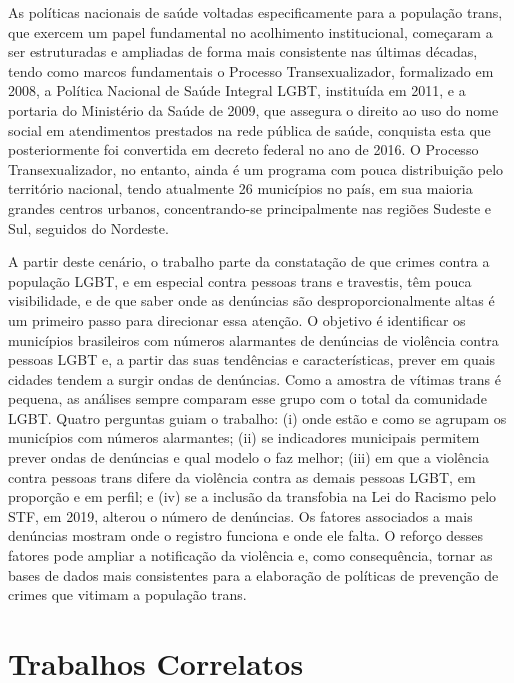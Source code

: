 \documentclass[12pt]{article}
\begin{document}
As políticas nacionais de saúde voltadas especificamente para a população trans, que exercem um papel fundamental no acolhimento institucional, começaram a ser estruturadas e ampliadas de forma mais consistente nas últimas décadas, tendo como marcos fundamentais o Processo Transexualizador, formalizado em 2008, a Política Nacional de Saúde Integral LGBT, instituída em 2011, e a portaria do Ministério da Saúde de 2009, que assegura o direito ao uso do nome social em atendimentos prestados na rede pública de saúde, conquista esta que posteriormente foi convertida em decreto federal no ano de 2016. O Processo Transexualizador, no entanto, ainda é um programa com pouca distribuição pelo território nacional, tendo atualmente 26 municípios no país, em sua maioria grandes centros urbanos, concentrando-se principalmente nas regiões Sudeste e Sul, seguidos do Nordeste.

A partir deste cenário, o trabalho parte da constatação de que crimes contra a população LGBT, e em especial contra pessoas trans e travestis, têm pouca visibilidade, e de que saber onde as denúncias são desproporcionalmente altas é um primeiro passo para direcionar essa atenção. O objetivo é identificar os municípios brasileiros com números alarmantes de denúncias de violência contra pessoas LGBT e, a partir das suas tendências e características, prever em quais cidades tendem a surgir ondas de denúncias. Como a amostra de vítimas trans é pequena, as análises sempre comparam esse grupo com o total da comunidade LGBT. Quatro perguntas guiam o trabalho: (i) onde estão e como se agrupam os municípios com números alarmantes; (ii) se indicadores municipais permitem prever ondas de denúncias e qual modelo o faz melhor; (iii) em que a violência contra pessoas trans difere da violência contra as demais pessoas LGBT, em proporção e em perfil; e (iv) se a inclusão da transfobia na Lei do Racismo pelo STF, em 2019, alterou o número de denúncias. Os fatores associados a mais denúncias mostram onde o registro funciona e onde ele falta. O reforço desses fatores pode ampliar a notificação da violência e, como consequência, tornar as bases de dados mais consistentes para a elaboração de políticas de prevenção de crimes que vitimam a população trans.


\section{Trabalhos Correlatos}
\end{document}

